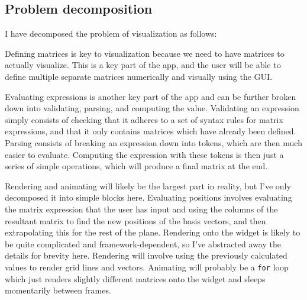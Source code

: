 \documentclass[../main.tex]{subfiles}
\begin{document}
\subsection{Problem decomposition\label{subsection:problem-decomposition}}

I have decomposed the problem of visualization as follows:
\begin{center}
\end{center}
Defining matrices is key to visualization because we need to have matrices to actually visualize. This is a key part of the app, and the user will be able to define multiple separate matrices numerically and visually using the GUI.

Evaluating expressions is another key part of the app and can be further broken down into validating, parsing, and computing the value. Validating an expression simply consists of checking that it adheres to a set of syntax rules for matrix expressions, and that it only contains matrices which have already been defined. Parsing consists of breaking an expression down into tokens, which are then much easier to evaluate. Computing the expression with these tokens is then just a series of simple operations, which will produce a final matrix at the end.

Rendering and animating will likely be the largest part in reality, but I've only decomposed it into simple blocks here. Evaluating positions involves evaluating the matrix expression that the user has input and using the columns of the resultant matrix to find the new positions of the basis vectors, and then extrapolating this for the rest of the plane. Rendering onto the widget is likely to be quite complicated and framework-dependent, so I've abstracted away the details for brevity here. Rendering will involve using the previously calculated values to render grid lines and vectors. Animating will probably be a \texttt{for} loop which just renders slightly different matrices onto the widget and sleeps momentarily between frames.
\end{document}
